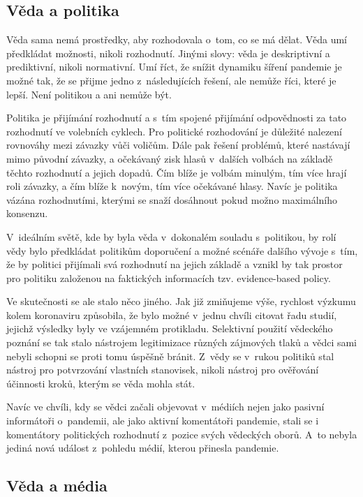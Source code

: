 \subsection*{Věda a politika}

Věda sama nemá prostředky, aby rozhodovala o~tom, co se má dělat. Věda umí předkládat možnosti, nikoli rozhodnutí. Jinými slovy: věda je deskriptivní a prediktivní, nikoli normativní. Umí říct, že snížit dynamiku šíření pandemie je možné tak, že se přijme jedno z~následujících řešení, ale nemůže říci, které je lepší. Není politikou a ani nemůže být.

Politika je přijímání rozhodnutí a s~tím spojené přijímání odpovědnosti za tato rozhodnutí ve volebních cyklech. Pro politické rozhodování je důležité nalezení rovnováhy mezi závazky vůči voličům. Dále pak řešení problémů, které nastávají mimo původní závazky, a očekávaný zisk hlasů v~dalších volbách na základě těchto rozhodnutí a jejich dopadů. Čím blíže je volbám minulým, tím více hrají roli závazky, a čím blíže k~novým, tím více očekávané hlasy. Navíc je politika vázána rozhodnutími, kterými se snaží dosáhnout pokud možno maximálního konsenzu.

V~ideálním světě, kde by byla věda v~dokonalém souladu s~politikou, by rolí vědy bylo předkládat politikům doporučení a možné scénáře dalšího vývoje s~tím, že by politici přijímali svá rozhodnutí na jejich základě a vznikl by tak prostor pro politiku založenou na faktických informacích tzv. evidence-based policy.

Ve skutečnosti se ale stalo něco jiného. Jak již zmiňujeme výše, rychlost výzkumu kolem koronaviru způsobila, že bylo možné v~jednu chvíli citovat řadu studií, jejichž výsledky byly ve vzájemném protikladu. Selektivní použití vědeckého poznání se tak stalo nástrojem legitimizace různých zájmových tlaků a vědci sami nebyli schopni se proti tomu úspěšně bránit. Z~vědy se v~rukou politiků stal nástroj pro potvrzování vlastních stanovisek, nikoli nástroj pro ověřování účinnosti kroků, kterým se věda mohla stát.

Navíc ve chvíli, kdy se vědci začali objevovat v~médiích nejen jako pasivní informátoři o~pandemii, ale jako aktivní komentátoři pandemie, stali se i komentátory politických rozhodnutí z~pozice svých vědeckých oborů. A~to nebyla jediná nová událost z~pohledu médií, kterou přinesla pandemie.

\subsection*{Věda a média}

